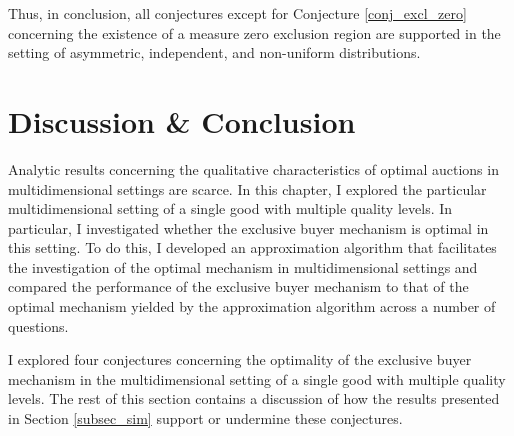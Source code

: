 


  

Thus, in conclusion, all conjectures except for Conjecture \ref{conj_excl_zero} concerning the existence of a measure zero exclusion region are supported in the setting of asymmetric, independent, and non-uniform distributions.




\section{Discussion \& Conclusion}\label{sec_discuss}

Analytic results concerning the qualitative characteristics of optimal auctions in multidimensional settings are scarce. In this chapter, I explored the particular multidimensional setting of a single good with multiple quality levels. In particular, I investigated whether the exclusive buyer mechanism is optimal in this setting. To do this, I developed an approximation algorithm that facilitates the investigation of the optimal mechanism in multidimensional settings and compared the performance of the exclusive buyer mechanism to that of the optimal mechanism yielded by the approximation algorithm across a number of questions. 

I explored four conjectures concerning the optimality of the exclusive buyer mechanism in the multidimensional setting of a single good with multiple quality levels. The rest of this section contains a discussion of how the results presented in Section \ref{subsec_sim} support or undermine these conjectures.

